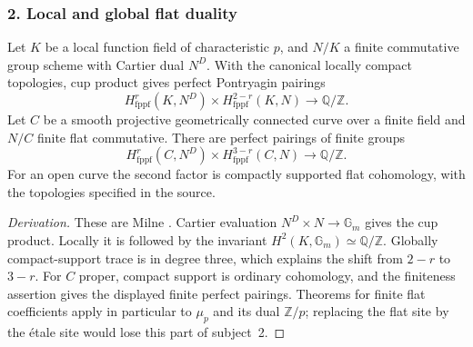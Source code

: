 \subsubsection{2. Local and global flat duality}
\begin{proposition}\label{B:subject2}
Let $K$ be a local function field of characteristic $p$, and $N/K$ a finite commutative group scheme with Cartier dual $N^D$. With the canonical locally compact topologies, cup product gives perfect Pontryagin pairings
\[
 H^r_{\mathrm{fppf}}(K,N^D)\times H^{2-r}_{\mathrm{fppf}}(K,N)
 \longrightarrow\mathbb Q/\mathbb Z.
\]
Let $C$ be a smooth projective geometrically connected curve over a finite field and $N/C$ finite flat commutative. There are perfect pairings of finite groups
\[
 H^r_{\mathrm{fppf}}(C,N^D)\times H^{3-r}_{\mathrm{fppf}}(C,N)
 \longrightarrow\mathbb Q/\mathbb Z.
\]
For an open curve the second factor is compactly supported flat cohomology, with the topologies specified in the source.
\end{proposition}
\begin{proof}[Derivation]
These are Milne \cite[III, Theorems 6.10 and 8.2, and Corollary 8.9]{BMilne2006}. Cartier evaluation $N^D\times N\to\mathbb G_m$ gives the cup product. Locally it is followed by the invariant $H^2(K,\mathbb G_m)\simeq\mathbb Q/\mathbb Z$. Globally compact-support trace is in degree three, which explains the shift from $2-r$ to $3-r$. For $C$ proper, compact support is ordinary cohomology, and the finiteness assertion gives the displayed finite perfect pairings. Theorems for finite flat coefficients apply in particular to $\mu_p$ and its dual $\mathbb Z/p$; replacing the flat site by the \'etale site would lose this part of subject~2.
\end{proof}

